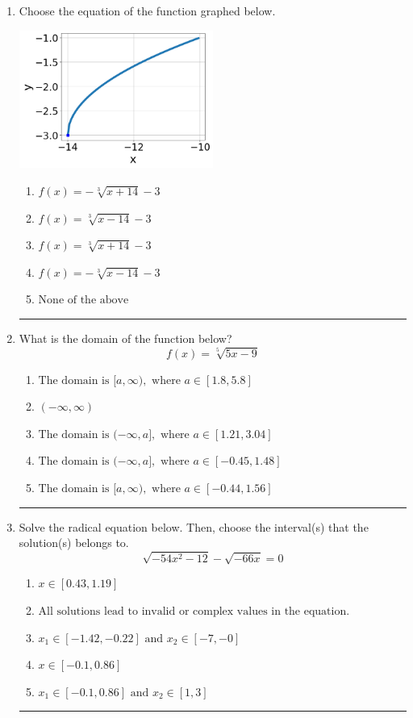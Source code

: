 \documentclass[14pt]{extbook}
\newcommand{\litem}[1]{\item#1\hspace*{-1cm}\rule{\textwidth}{0.4pt}}
\begin{document}
\begin{enumerate}
{\begin{enumerate}[label=\Alph*.]
\end{enumerate} }
\litem{
Choose the equation of the function graphed below.
\begin{center}
    \includegraphics[width=0.5\textwidth]{../Figures/radicalGraphToEquationCopyB.png}
\end{center}
\begin{enumerate}[label=\Alph*.]
\item \( f(x) = - \sqrt[3]{x + 14} - 3 \)
\item \( f(x) = \sqrt[3]{x - 14} - 3 \)
\item \( f(x) = \sqrt[3]{x + 14} - 3 \)
\item \( f(x) = - \sqrt[3]{x - 14} - 3 \)
\item \( \text{None of the above} \)

\end{enumerate} }
\litem{
What is the domain of the function below?\[ f(x) = \sqrt[5]{5 x - 9} \]\begin{enumerate}[label=\Alph*.]
\item \( \text{The domain is } [a, \infty), \text{   where } a \in [1.8, 5.8] \)
\item \( (-\infty, \infty) \)
\item \( \text{The domain is } (-\infty, a], \text{   where } a \in [1.21, 3.04] \)
\item \( \text{The domain is } (-\infty, a], \text{   where } a \in [-0.45, 1.48] \)
\item \( \text{The domain is } [a, \infty), \text{   where } a \in [-0.44, 1.56] \)

\end{enumerate} }
\litem{
Solve the radical equation below. Then, choose the interval(s) that the solution(s) belongs to.\[ \sqrt{-54 x^2 - 12} - \sqrt{-66 x} = 0 \]\begin{enumerate}[label=\Alph*.]
\item \( x \in [0.43,1.19] \)
\item \( \text{All solutions lead to invalid or complex values in the equation.} \)
\item \( x_1 \in [-1.42, -0.22] \text{ and } x_2 \in [-7,-0] \)
\item \( x \in [-0.1,0.86] \)
\item \( x_1 \in [-0.1, 0.86] \text{ and } x_2 \in [1,3] \)


\end{enumerate}}
\end{enumerate}
\end{document}
